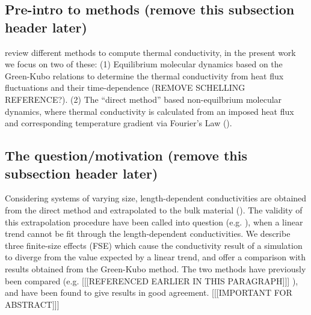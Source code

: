 \documentclass[%
preprint,                                  %
nofootinbib,
 amsmath,amssymb,
 aps,
]{revtex4-1}
\begin{document}

\subsection{\label{sec:intro.pre}Pre-intro to methods (remove this subsection header later)}

\citet{Stackhouse2010} review different methods to compute thermal conductivity, in the present work we focus on two of these:
(1) Equilibrium molecular dynamics based on the Green-Kubo relations to determine the thermal conductivity from heat flux fluctuations and their time-dependence (\citet{Green1954,Kubo1957,Kubo1966,Schelling2002}REMOVE SCHELLING REFERENCE?). 
(2) The ``direct method'' based non-equilbrium molecular dynamics, where thermal conductivity is calculated from an imposed heat flux and corresponding temperature gradient via Fourier's Law (\citet{Muller-Plathe1997,Nieto-Draghi2013}).


\subsection{\label{sec:intro.question}The question/motivation (remove this subsection header later)}

Considering systems of varying size, length-dependent conductivities are obtained from the direct method and extrapolated to the bulk material (\citet{Schelling2002}). The validity of this extrapolation procedure have been called into question (e.g. \citet{Sellan2010}), when a linear trend cannot be fit through the length-dependent conductivities. We describe three finite-size effects (FSE) which cause the conductivity result of a simulation to diverge from the value expected by a linear trend, and offer a comparison with results obtained from the Green-Kubo method. The two methods have previously been compared (e.g. \citet{Schelling2002} [[[REFERENCED EARLIER IN THIS PARAGRAPH]]] ), and have been found to give results in good agreement. [[[IMPORTANT FOR ABSTRACT]]]
\end{document}
